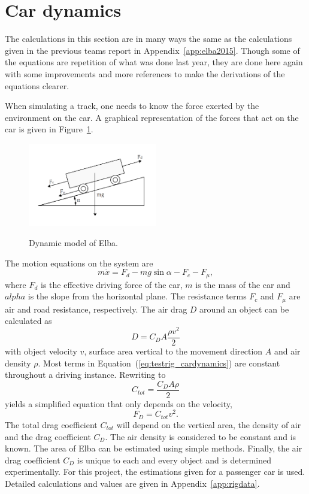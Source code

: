 \section{Car dynamics}\label{sec:cardynamics}
The calculations in this section are in many ways the same as the calculations
given in the previous teams report in Appendix~\ref{app:elba2015}. Though some
of the equations are repetition of what was done last year, they are
done here again with some improvements and more references to make the
derivations of the equations clearer.

When simulating a track, one needs to know the force exerted by the environment
on the car. A graphical representation of the forces that act on the car is
given in Figure~\ref{fig:testrig_elbadynamics}.
\begin{figure}[H]
    \centering\label{fig:testrig_elbadynamics}
    \includegraphics[width=0.5\textwidth]{./img/testrig_elbaforces.png}
    \caption{Dynamic model of Elba.}
\end{figure}
The motion equations on the system are 
\begin{equation} \label{eq:testrig_cardynamics}
    m\ddot{x} = F_d - mg\sin{\alpha} - F_c - F_{\mu},
\end{equation}
where $F_d$ is the effective driving force of the car, $m$ is the mass of the
car and $alpha$ is the slope from the horizontal plane. The resistance terms
$F_c$ and $F_{\mu}$ are air and road resistance, respectively. The air drag $D$
around an object can be calculated as~\cite{nakayama2002}
\begin{equation} \label{eq:testrig_airdrag}
    D = C_D A \frac{\rho v^2} {2}
\end{equation}
with object velocity $v$, surface area vertical to the movement direction $A$
and air density $\rho$. Most terms in Equation~(\ref{eq:testrig_cardynamics})
are constant throughout a driving instance. Rewriting to
\begin{equation} \label{eq:testrig_csimple}
    C_{tot} = \frac{C_D A \rho} {2}
\end{equation}
yields a simplified equation that only depends on the velocity,
\begin{equation} \label{eq:drag}
    F_D = C_{tot}v^2.
\end{equation}
The total drag coefficient $C_{tot}$ will depend on the vertical area, the density of
air and the drag coefficient $C_D$. The air density is considered to be constant
and is known. The area of Elba can be estimated using simple methods. Finally,
the air drag coefficient $C_D$ is unique to each and every object and is
determined experimentally. For this project, the estimations given for a
passenger car is used. Detailed calculations and values are given in
Appendix~\ref{app:rigdata}. 

